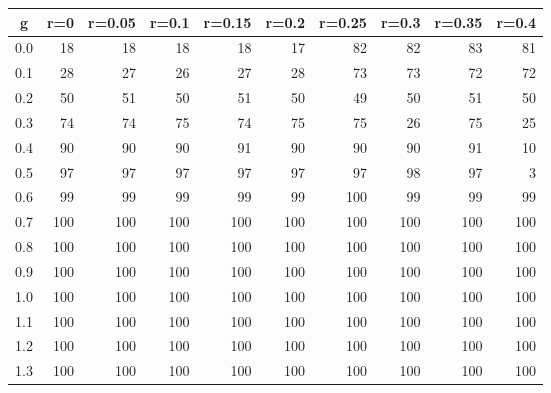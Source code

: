 %
\begin{table}[!tbp]
 \begin{center}
 \begin{tabular}{rrrrrrrrrr}\hline\hline
\multicolumn{1}{c}{g}&\multicolumn{1}{c}{r=0}&\multicolumn{1}{c}{r=0.05}&\multicolumn{1}{c}{r=0.1}&\multicolumn{1}{c}{r=0.15}&\multicolumn{1}{c}{r=0.2}&\multicolumn{1}{c}{r=0.25}&\multicolumn{1}{c}{r=0.3}&\multicolumn{1}{c}{r=0.35}&\multicolumn{1}{c}{r=0.4}\tabularnewline
\hline
0.0& 18& 18& 18& 18& 17& 82& 82& 83& 81\tabularnewline
0.1& 28& 27& 26& 27& 28& 73& 73& 72& 72\tabularnewline
0.2& 50& 51& 50& 51& 50& 49& 50& 51& 50\tabularnewline
0.3& 74& 74& 75& 74& 75& 75& 26& 75& 25\tabularnewline
0.4& 90& 90& 90& 91& 90& 90& 90& 91& 10\tabularnewline
0.5& 97& 97& 97& 97& 97& 97& 98& 97&  3\tabularnewline
0.6& 99& 99& 99& 99& 99&100& 99& 99& 99\tabularnewline
0.7&100&100&100&100&100&100&100&100&100\tabularnewline
0.8&100&100&100&100&100&100&100&100&100\tabularnewline
0.9&100&100&100&100&100&100&100&100&100\tabularnewline
1.0&100&100&100&100&100&100&100&100&100\tabularnewline
1.1&100&100&100&100&100&100&100&100&100\tabularnewline
1.2&100&100&100&100&100&100&100&100&100\tabularnewline
1.3&100&100&100&100&100&100&100&100&100\tabularnewline
\hline
\end{tabular}

\end{center}

\end{table}

